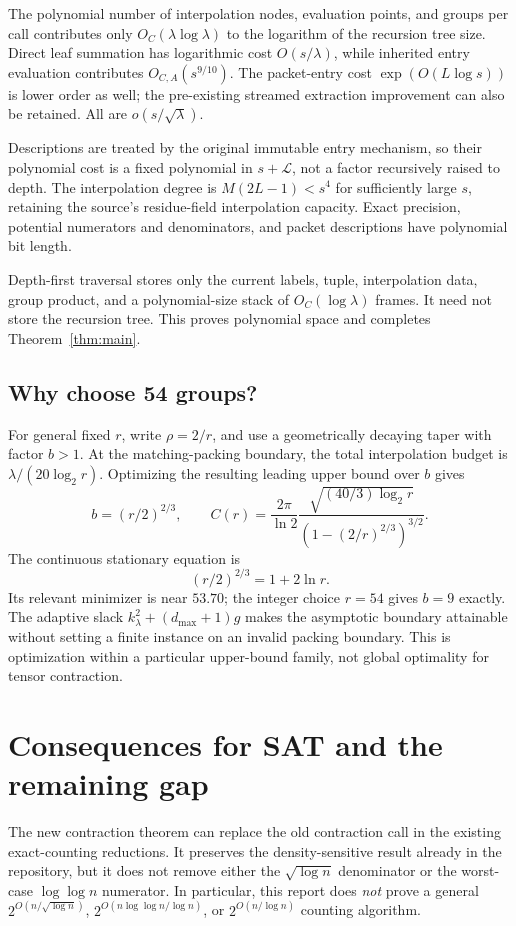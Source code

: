 \documentclass[11pt]{article}
\theoremstyle{remark}\newtheorem{remark}[theorem]{Remark}
\newcommand{\LL}{\mathcal L}
\begin{document}
The polynomial number of interpolation nodes, evaluation points, and groups per call contributes only \(O_C(\lambda\log\lambda)\) to the logarithm of the recursion tree size. Direct leaf summation has logarithmic cost \(O(s/\lambda)\), while inherited entry evaluation contributes \(O_{C,A}(s^{9/10})\). The packet-entry cost \(\exp(O(L\log s))\) is lower order as well; the pre-existing streamed extraction improvement can also be retained. All are \(o(s/\sqrt\lambda)\).

Descriptions are treated by the original immutable entry mechanism, so their polynomial cost is a fixed polynomial in \(s+\LL\), not a factor recursively raised to depth. The interpolation degree is \(M(2L-1)<s^4\) for sufficiently large \(s\), retaining the source's residue-field interpolation capacity. Exact precision, potential numerators and denominators, and packet descriptions have polynomial bit length.

Depth-first traversal stores only the current labels, tuple, interpolation data, group product, and a polynomial-size stack of \(O_C(\log\lambda)\) frames. It need not store the recursion tree. This proves polynomial space and completes Theorem~\ref{thm:main}.

\subsection{Why choose 54 groups?}
For general fixed \(r\), write \(\rho=2/r\), and use a geometrically decaying taper with factor \(b>1\). At the matching-packing boundary, the total interpolation budget is \(\lambda/(20\log_2r)\). Optimizing the resulting leading upper bound over \(b\) gives
\[
 b=(r/2)^{2/3},\qquad
 C(r)=\frac{2\pi}{\ln2}
 \frac{\sqrt{(40/3)\log_2r}}
      {(1-(2/r)^{2/3})^{3/2}}.
\]
The continuous stationary equation is
\[
 (r/2)^{2/3}=1+2\ln r.
\]
Its relevant minimizer is near \(53.70\); the integer choice \(r=54\) gives \(b=9\) exactly. The adaptive slack \(k_\lambda^2+(d_{\max}+1)g\) makes the asymptotic boundary attainable without setting a finite instance on an invalid packing boundary. This is optimization within a particular upper-bound family, not global optimality for tensor contraction.

\section{Consequences for SAT and the remaining gap}
\label{sec:remaining}
The new contraction theorem can replace the old contraction call in the existing exact-counting reductions. It preserves the density-sensitive result already in the repository, but it does not remove either the \(\sqrt{\log n}\) denominator or the worst-case \(\log\log n\) numerator. In particular, this report does \emph{not} prove a general \(2^{O(n/\sqrt{\log n})}\), \(2^{O(n\log\log n/\log n)}\), or \(2^{O(n/\log n)}\) counting algorithm.
\end{document}
